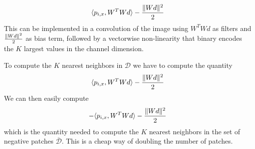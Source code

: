 \documentclass{article}
\begin{document}
\[
        \langle p_{i,x}, W^T W d \rangle - {\|Wd \|^2 \over 2} 
\]
This can be implemented in a convolution of the image using $W^T W d$ as filters and ${\|Wd \|^2 \over 2}$ as bias term, followed by a vectorwise non-linearity that binary encodes the $K$ largest values in the channel dimension.

To compute the $K$ nearest neighbors in $\mathcal{D}$ we have to compute the quantity
\begin{align*} \langle p_{i,x}, W^T W d \rangle - {\|Wd \|^2 \over 2} \end{align*}
We can then easily compute 
\begin{align*} - \langle p_{i,x}, W^T W d \rangle - {\|Wd \|^2 \over 2} \end{align*} which is the quantity needed to compute the $K$ nearest neighbors in the set of negative patches $\overline{\mathcal{D}}$.
This is a cheap way of doubling the number of patches.
\end{document}
